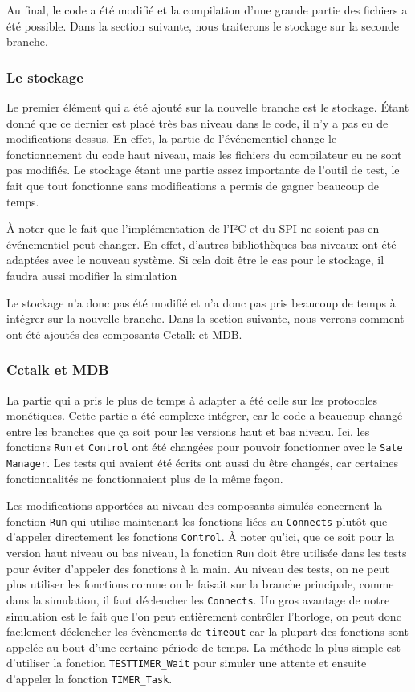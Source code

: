 \documentclass[a4paper]{article}
\begin{document}
Au final, le code a été modifié et la compilation d'une grande partie des
fichiers a été possible. Dans la section suivante, nous traiterons le stockage sur
la seconde branche.

\subsubsection*{Le stockage}

Le premier élément qui a été ajouté sur la nouvelle branche est le stockage.
Étant donné que ce dernier est placé très bas niveau dans le code, il n'y a pas
eu de modifications dessus. En effet, la partie de l'événementiel change le
fonctionnement du code haut niveau, mais les fichiers du compilateur eu ne sont
pas modifiés. Le stockage étant une partie assez importante de l'outil de test,
le fait que tout fonctionne sans modifications a permis de gagner beaucoup de
temps.

À noter que le fait que l'implémentation de l'I²C et du SPI ne soient pas en
événementiel peut changer. En effet, d'autres bibliothèques bas niveaux ont
été adaptées avec le nouveau système. Si cela doit être le cas pour le stockage,
il faudra aussi modifier la simulation

Le stockage n'a donc pas été modifié et n'a donc pas pris beaucoup de temps à
intégrer sur la nouvelle branche. Dans la section suivante, nous verrons comment
ont été ajoutés des composants Cctalk et MDB.

\subsubsection*{Cctalk et MDB}

La partie qui a pris le plus de temps à adapter a été celle sur les protocoles
monétiques. Cette partie a été complexe intégrer, car le code a beaucoup changé
entre les branches que ça soit pour les versions haut et bas niveau. Ici, les
fonctions \verb|Run| et \verb|Control| ont été changées pour pouvoir fonctionner
avec le \verb|Sate Manager|. Les tests qui avaient été écrits ont aussi du être
changés, car certaines fonctionnalités ne fonctionnaient plus de la même façon.

Les modifications apportées au niveau des composants simulés concernent la
fonction \verb|Run| qui utilise maintenant les fonctions liées au \verb|Connects|
plutôt que d'appeler directement les fonctions \verb|Control|. À noter qu'ici,
que ce soit pour la version haut niveau ou bas niveau, la fonction \verb|Run|
doit être utilisée dans les tests pour éviter d'appeler des fonctions à la main.
Au niveau des tests, on ne peut plus utiliser les fonctions comme on le faisait
sur la branche principale, comme dans la simulation, il faut déclencher les
\verb|Connects|. Un gros avantage de notre simulation est le fait que l'on peut
entièrement contrôler l'horloge, on peut donc facilement déclencher les
évènements de \verb|timeout| car la plupart des fonctions sont appelée au bout
d'une certaine période de temps. La méthode la plus simple est d'utiliser la
fonction \verb|TESTTIMER_Wait| pour simuler une attente et ensuite d'appeler la
fonction \verb|TIMER_Task|.
\end{document}
